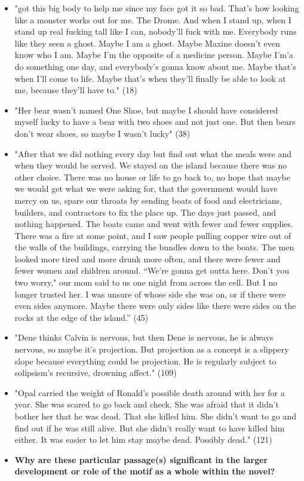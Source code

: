 \documentclass[letterpaper]{article}
\begin{document}
\begin{itemize}
\item "got this big body to help me since my face got it so bad. That's how
looking like a monster works out for me. The Drome. And when I stand
up, when I stand up real fucking tall like I can, nobody'll fuck with
me. Everybody runs like they seen a ghost. Maybe I am a ghost. Maybe
Maxine doesn't even know who I am. Maybe I'm the opposite of a
medicine person. Maybe I'm'a do something one day, and everybody's
gonna know about me. Maybe that's when I'll come to life. Maybe that's
when they'll finally be able to look at me, because they'll have to."
(18)\\

\item "Her bear wasn't named One Shoe, but maybe I should have considered
myself lucky to have a bear with two shoes and not just one. But then
bears don't wear shoes, so maybe I wasn't lucky" (38)

\item "After that we did nothing every day but find out what the meals were
and when they would be served. We stayed on the island because there
was no other choice. There was no house or life to go back to, no hope
that maybe we would get what we were asking for, that the government
would have mercy on us, spare our throats by sending boats of food and
electricians, builders, and contractors to fix the place up. The days
just passed, and nothing happened. The boats came and went with fewer
and fewer supplies. There was a fire at some point, and I saw people
pulling copper wire out of the walls of the buildings, carrying the
bundles down to the boats. The men looked more tired and more drunk
more often, and there were fewer and fewer women and children around.
“We're gonna get outta here. Don't you two worry," our mom said to us
one night from across the cell. But I no longer trusted her. I was
unsure of whose side she was on, or if there were even sides anymore.
Maybe there were only sides like there were sides on the rocks at the
edge of the island.” (45)

\item "Dene thinks Calvin is nervous, but then Dene is nervous, he is always
nervous, so maybe it's projection. But projection as a concept is a
slippery slope because everything could be projection. He is regularly
subject to solipsism's recursive, drowning affect." (109)

\item "Opal carried the weight of Ronald's possible death around with her
for a year. She was scared to go back and check. She was afraid that
it didn't bother her that he was dead. That she killed him. She didn't
want to go and find out if he was still alive. But she didn't really
want to have killed him either. It was easier to let him stay maybe
dead. Possibly dead." (121)

\item \textbf{Why are these particular passage(s) significant in the larger
development or role of the motif as a whole within the novel?}
\end{itemize}
\end{document}
